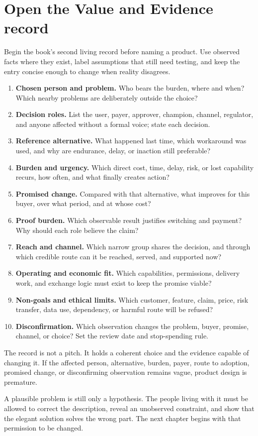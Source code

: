 \newpage
\section{Open the Value and Evidence record}

Begin the book's second living record before naming a product. Use observed
facts where they exist, label assumptions that still need testing, and keep the
entry concise enough to change when reality disagrees.

\begin{enumerate}[itemsep=0.1em,topsep=0.3em]
\item \textbf{Chosen person and problem.} Who bears the burden, where and when?
  Which nearby problems are deliberately outside the choice?
\item \textbf{Decision roles.} List the user, payer, approver, champion, channel,
  regulator, and anyone affected without a formal voice; state each decision.
\item \textbf{Reference alternative.} What happened last time, which workaround
  was used, and why are endurance, delay, or inaction still preferable?
\item \textbf{Burden and urgency.} Which direct cost, time, delay, risk, or lost
  capability recurs, how often, and what finally creates action?
\item \textbf{Promised change.} Compared with that alternative, what improves
  for this buyer, over what period, and at whose cost?
\item \textbf{Proof burden.} Which observable result justifies switching and
  payment? Why should each role believe the claim?
\item \textbf{Reach and channel.} Which narrow group shares the decision, and
  through which credible route can it be reached, served, and supported now?
\item \textbf{Operating and economic fit.} Which capabilities, permissions,
  delivery work, and exchange logic must exist to keep the promise viable?
\item \textbf{Non-goals and ethical limits.} Which customer, feature, claim,
  price, risk transfer, data use, dependency, or harmful route will be refused?
\item \textbf{Disconfirmation.} Which observation changes the problem, buyer,
  promise, channel, or choice? Set the review date and stop-spending rule.
\end{enumerate}

The record is not a pitch. It holds a coherent choice and the evidence capable
of changing it. If the affected person, alternative, burden, payer, route to
adoption, promised change, or disconfirming observation remains vague, product
design is premature.

A plausible problem is still only a hypothesis. The people living with it must
be allowed to correct the description, reveal an unobserved constraint, and
show that the elegant solution solves the wrong part. The next chapter begins
with that permission to be changed.
